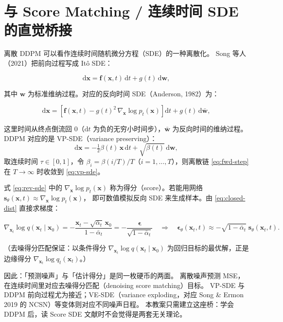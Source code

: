 \documentclass[a4paper,fontset=none,zihao=5]{ctexart}
\numberwithin{equation}{section}
\newcommand{\x}{\mathbf{x}}
\newcommand{\abar}{\bar{\alpha}}
\newcommand{\eps}{\boldsymbol{\epsilon}}
\newcommand{\epst}{\boldsymbol{\epsilon}_\theta}
\begin{document}
\section{与 Score Matching / 连续时间 SDE 的直觉桥接}
离散 DDPM 可以看作连续时间随机微分方程（SDE）的一种离散化。
Song 等人（2021）把前向过程写成 Itô SDE：
\begin{keybox}
\begin{equation}
  \mathrm{d}\x = \mathbf{f}(\x,t)\,\mathrm{d}t + g(t)\,\mathrm{d}\mathbf{w},
  \label{eq:fwd-sde}
\end{equation}
\end{keybox}
其中 $\mathbf{w}$ 为标准维纳过程。对应的反向时间 SDE（Anderson, 1982）为：
\begin{keybox}
\begin{equation}
  \mathrm{d}\x = \left[\mathbf{f}(\x,t) - g(t)^2\,\nabla_{\x}\log p_t(\x)\right]\mathrm{d}t + g(t)\,\mathrm{d}\bar{\mathbf{w}},
  \label{eq:rev-sde}
\end{equation}
\end{keybox}
这里时间从终点倒流回 $0$（$\mathrm{d}t$ 为负的无穷小时间步），$\bar{\mathbf{w}}$ 为反向时间的维纳过程。
DDPM 对应的是 VP-SDE（variance preserving）：
\begin{equation}
  \mathrm{d}\x = -\tfrac12\beta(t)\,\x\,\mathrm{d}t + \sqrt{\beta(t)}\,\mathrm{d}\mathbf{w},
  \label{eq:vp-sde}
\end{equation}
取连续时间 $\tau\in[0,1]$，令 $\beta_i=\beta(i/T)/T$（$i=1,\dots,T$），则离散链 \eqref{eq:fwd-step} 在 $T\to\infty$ 时收敛到 \eqref{eq:vp-sde}。

式 \eqref{eq:rev-sde} 中的 $\nabla_{\x}\log p_t(\x)$ 称为得分（score）。若能用网络 $\mathbf{s}_\theta(\x,t)\approx\nabla_{\x}\log p_t(\x)$，
即可数值模拟反向 SDE 来生成样本。由 \eqref{eq:closed-dist} 直接求梯度：
\begin{keybox}
\begin{equation}
  \nabla_{\x_t}\log q(\x_t\mid\x_0) = -\frac{\x_t-\sqrt{\abar_t}\,\x_0}{1-\abar_t} = -\frac{\eps}{\sqrt{1-\abar_t}}
  \quad\Longrightarrow\quad
  \epst(\x_t,t)\approx-\sqrt{1-\abar_t}\;\mathbf{s}_\theta(\x_t,t).
  \label{eq:eps-score}
\end{equation}
\end{keybox}
（去噪得分匹配保证：以条件得分 $\nabla_{\x_t}\log q(\x_t\mid\x_0)$ 为回归目标的最优解，正是边缘得分 $\nabla_{\x_t}\log q_t(\x_t)$。）

因此：「预测噪声」与「估计得分」是同一枚硬币的两面。
离散噪声预测 MSE，在连续时间里对应去噪得分匹配（denoising score matching）目标。
VP-SDE 与 DDPM 前向过程尤为接近；VE-SDE（variance exploding，对应 Song \& Ermon 2019 的 NCSN）等变体则对应不同噪声日程。
本教案只需建立这座桥：学会 DDPM 后，读 Score SDE 文献时不会觉得是两套无关理论。
\end{document}
